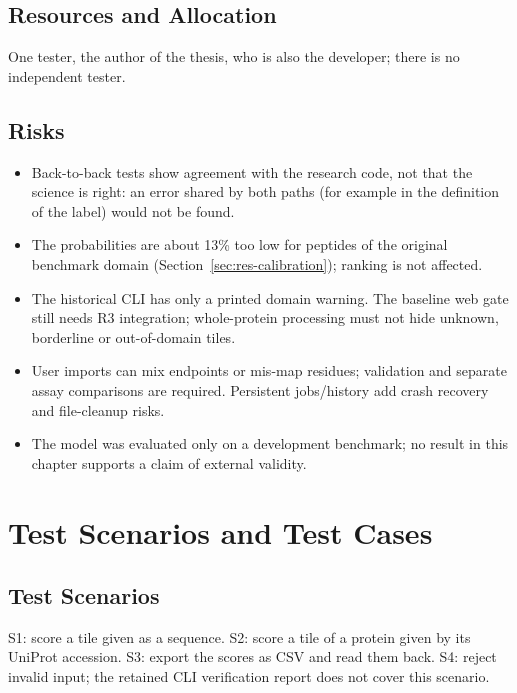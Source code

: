 \subsection{Resources and Allocation}
One tester, the author of the thesis, who is also the developer; there is no independent tester.
\subsection{Risks}
\begin{itemize}
  \item Back-to-back tests show agreement with the research code, not that the science is right: an error shared by both paths (for example in the definition of the label) would not be found.
  \item The probabilities are about 13\% too low for peptides of the original benchmark domain (Section~\ref{sec:res-calibration}); ranking is not affected.
  \item The historical CLI has only a printed domain warning. The baseline web gate still needs R3
        integration; whole-protein processing must not hide unknown, borderline or out-of-domain tiles.
  \item User imports can mix endpoints or mis-map residues; validation and separate assay comparisons
        are required. Persistent jobs/history add crash recovery and file-cleanup risks.
  \item The model was evaluated only on a development benchmark; no result in this chapter supports a claim of external validity.
\end{itemize}

\section{Test Scenarios and Test Cases}
\subsection{Test Scenarios}
S1: score a tile given as a sequence. S2: score a tile of a protein given by its UniProt accession. S3: export the scores as CSV and read them back.
S4: reject invalid input; the retained CLI verification report does not cover this scenario.
